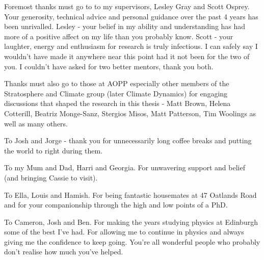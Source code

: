 \begin{acknowledgements}

Foremost thanks must go to to my supervisors, Lesley Gray and Scott Osprey. Your generosity, technical advice and personal guidance over the past 4 years has been unrivalled. Lesley - your belief in my ability and understanding has had more of a positive affect on my life than you probably know. Scott - your laughter, energy and enthusiasm for research is truly infectious. I can safely say I wouldn't have made it anywhere near this point had it not been for the two of you. I couldn't have asked for two better mentors, thank you both.

Thanks must also go to those at AOPP especially other members of the Stratosphere and Climate group (later Climate Dynamics) for engaging discussions that shaped the research in this thesis - Matt Brown, Helena Cotterill, Beatriz Monge-Sanz, Stergios Misos, Matt Patterson, Tim Woolings as well as many others. 

To Josh and Jorge - thank you for unnecessarily long coffee breaks and putting the world to right during them.

To my Mum and Dad, Harri and Georgia. For unwavering support and belief (and bringing Cassie to visit).

To Ella, Louis and Hamish. For being fantastic housemates at 47 Oatlands Road and for your companionship through the high and low points of a PhD.

To Cameron, Josh and Ben. For making the years studying physics at Edinburgh some of the best I've had. For allowing me to continue in physics and always giving me the confidence to keep going. You're all wonderful people who probably don't realise how much you've helped.

\end{acknowledgements}




